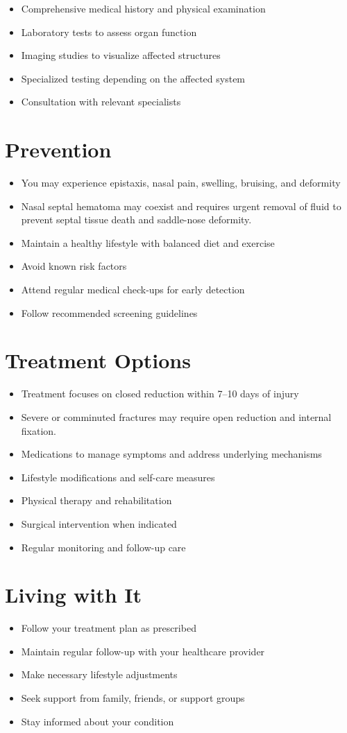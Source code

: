 \begin{itemize}[noitemsep]
  \item Comprehensive medical history and physical examination
  \item Laboratory tests to assess organ function
  \item Imaging studies to visualize affected structures
  \item Specialized testing depending on the affected system
  \item Consultation with relevant specialists
\end{itemize}
\section{Prevention}
\begin{itemize}[noitemsep]
  \item You may experience epistaxis, nasal pain, swelling, bruising, and deformity
  \item Nasal septal hematoma may coexist and requires urgent removal of fluid to prevent septal tissue death and saddle-nose deformity.
  \item Maintain a healthy lifestyle with balanced diet and exercise
  \item Avoid known risk factors
  \item Attend regular medical check-ups for early detection
  \item Follow recommended screening guidelines
\end{itemize}
\section{Treatment Options}
\begin{itemize}[noitemsep]
  \item Treatment focuses on closed reduction within 7--10 days of injury
  \item Severe or comminuted fractures may require open reduction and internal fixation.
  \item Medications to manage symptoms and address underlying mechanisms
  \item Lifestyle modifications and self-care measures
  \item Physical therapy and rehabilitation
  \item Surgical intervention when indicated
  \item Regular monitoring and follow-up care
\end{itemize}
\section{Living with It}
\begin{itemize}[noitemsep]
  \item Follow your treatment plan as prescribed
  \item Maintain regular follow-up with your healthcare provider
  \item Make necessary lifestyle adjustments
  \item Seek support from family, friends, or support groups
  \item Stay informed about your condition
\end{itemize}
